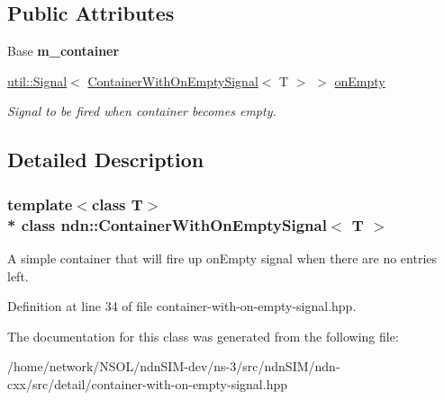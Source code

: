 \subsection*{Public Attributes}
\begin{DoxyCompactItemize}
\item 
Base {\bfseries m\+\_\+container}\hypertarget{classndn_1_1ContainerWithOnEmptySignal_ab8996b023afc4cc728920341bb3b2eed}{}\label{classndn_1_1ContainerWithOnEmptySignal_ab8996b023afc4cc728920341bb3b2eed}

\item 
\hyperlink{classndn_1_1util_1_1signal_1_1Signal}{util\+::\+Signal}$<$ \hyperlink{classndn_1_1ContainerWithOnEmptySignal}{Container\+With\+On\+Empty\+Signal}$<$ T $>$ $>$ \hyperlink{classndn_1_1ContainerWithOnEmptySignal_a7e8e4033c2474063270f9cc3fc9f00b8}{on\+Empty}\hypertarget{classndn_1_1ContainerWithOnEmptySignal_a7e8e4033c2474063270f9cc3fc9f00b8}{}\label{classndn_1_1ContainerWithOnEmptySignal_a7e8e4033c2474063270f9cc3fc9f00b8}

\begin{DoxyCompactList}\small\item\em Signal to be fired when container becomes empty. \end{DoxyCompactList}\end{DoxyCompactItemize}


\subsection{Detailed Description}
\subsubsection*{template$<$class T$>$\\*
class ndn\+::\+Container\+With\+On\+Empty\+Signal$<$ T $>$}

A simple container that will fire up on\+Empty signal when there are no entries left. 

Definition at line 34 of file container-\/with-\/on-\/empty-\/signal.\+hpp.



The documentation for this class was generated from the following file\+:\begin{DoxyCompactItemize}
\item 
/home/network/\+N\+S\+O\+L/ndn\+S\+I\+M-\/dev/ns-\/3/src/ndn\+S\+I\+M/ndn-\/cxx/src/detail/container-\/with-\/on-\/empty-\/signal.\+hpp\end{DoxyCompactItemize}
